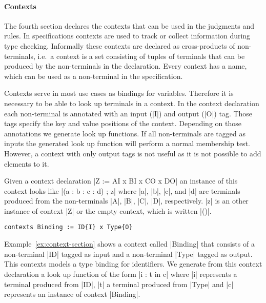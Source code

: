 \paragraph{Contexts} The fourth section declares the contexts that can
be used in the judgments and rules. In specifications contexts are
used to track or collect information during type checking. Informally
these contexts are declared as cross-products of non-terminals, i.e.\
a context is a set consisting of tuples of terminals that can be
produced by the non-terminals in the declaration. Every context has a
name, which can be used as a non-terminal in the specification.

Contexts serve in most use cases as bindings for variables. Therefore
it is necessary to be able to look up terminals in a context. In the
context declaration each non-terminal is annotated with an input
(\code|{I}|) and output (\code|{O}|) tag. Those tags specify the key and
value positions of the context. Depending on those annotations we
generate look up functions. If all non-terminals are tagged as inputs
the generated look up function will perform a normal membership
test. However, a context with only output tags is not useful as it is
not possible to add elements to it.

Given a context declaration \code|Z := A{I} x B{I} x C{O} x D{O}| an
instance of this context looks like \code|(a : b : c : d) ; z| where
\code|a|, \code|b|, \code|c|, and \code|d| are terminals produced from
the non-terminals \code|A|, \code|B|, \code|C|, \code|D|,
respectively. \code|z| is an other instance of context \code|Z| or the
empty context, which is written \code|()|.

\begin{example}
\begin{lstlisting}[language=sltc]
contexts Binding := ID{I} x Type{O}
\end{lstlisting}
\label{ex:context-section}
\end{example}

Example~\ref{ex:context-section} shows a context called \code|Binding|
that consists of a non-terminal \code|ID| tagged as input and a
non-terminal \code|Type| tagged as output. This contexts models a type
binding for identifiers. We generate from this context declaration a
look up function of the form \code|i : t in c| where \code|i|
represents a terminal produced from \code|ID|, \code|t| a terminal
produced from \code|Type| and \code|c| represents an instance of
context \code|Binding|. 

